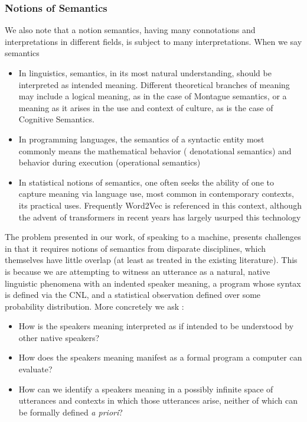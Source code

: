 \documentclass[a4paper, 11pt]{article}
\begin{document}
\subsubsection{Notions of Semantics}

We also note that a notion semantics, having many connotations and interpretations in
different fields, is subject to many interpretations. When we say semantics

\begin{itemize}
\item In linguistics, semantics, in its most natural understanding, should be
interpreted as intended meaning. Different theoretical branches of meaning may
include a logical meaning, as in the case of Montague semantics, or a meaning as
it arises in the use and context of culture, as is the case of Cognitive
Semantics.
\item In programming languages, the semantics of a syntactic entity most
commonly means the mathematical behavior ( denotational semantics) and behavior
during execution (operational semantics)
\item In statistical notions of semantics, one often seeks the ability of one to
capture meaning via language use, most common in contemporary contexts, its
practical uses. Frequently Word2Vec \cite{word2vec} is referenced in this context,
although the advent of transformers in recent years has largely usurped this technology
\end{itemize}

The problem presented in our work, of speaking to a machine, presents challenges
in that it requires notions of semantics from disparate disciplines, which
themselves have little overlap (at least as treated in the existing literature).
This is because we are attempting to witness an utterance as a natural, native
linguistic phenomena with an indented speaker meaning, a program whose syntax is
defined via the CNL, and a statistical observation defined over some probability
distribution. More concretely we ask :

\begin{itemize}
\item How is the speakers meaning interpreted as if intended to be understood by
  other native speakers?
\item How does the speakers meaning manifest as a formal program a computer can
  evaluate?
\item How can we identify a speakers meaning in a possibly infinite space of
  utterances and contexts in which those utterances arise, neither of which can
  be formally defined \emph{a priori}?
\end{itemize}
\end{document}
